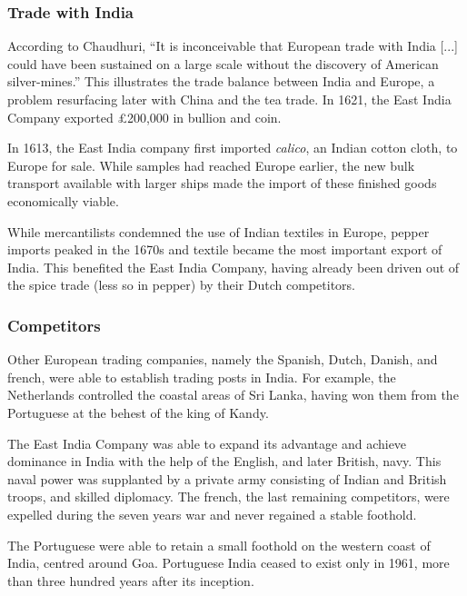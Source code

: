 \documentclass[11pt, a4paper, headings=standardclasses]{scrartcl}
\begin{document}
\subsubsection{Trade with India}
\label{balance}
According to Chaudhuri, ``It is inconceivable that European trade with India [...] could have been sustained on a large scale without the discovery of American silver-mines.''\autocite[395]{FT} This illustrates the trade balance between India and Europe, a problem resurfacing later with China and the tea trade. In 1621, the East India Company exported \pounds{}200,000 in bullion and coin.\autocite[398]{FT}

In 1613, the East India company first imported \textit{calico}, an Indian cotton cloth, to Europe for sale. While samples had reached Europe earlier, the new bulk transport available with larger ships made the import of these finished goods economically viable.\autocite[400]{FT, Calico}

While mercantilists condemned the use of Indian textiles in Europe, pepper imports peaked in the 1670s\autocite[399]{FT} and textile became the most important export of India. This benefited the East India Company, having already been driven out of the spice trade (less so in pepper) by their Dutch competitors.\autocite[401--407]{FT}

\subsubsection{Competitors}

Other European trading companies, namely the Spanish, Dutch, Danish, and french, were able to establish trading posts in India. For example, the Netherlands controlled the coastal areas of Sri Lanka, having won them from the Portuguese at the behest of the king of Kandy.\autocite[Chapter 5]{dutch}

The East India Company was able to expand its advantage and achieve dominance in India with the help of the English, and later British, navy. This naval power was supplanted by a private army consisting of Indian and British troops, and skilled diplomacy.\autocite{ms} The french, the last remaining competitors, were expelled during the seven years war and never regained a stable foothold.\autocite[132-33]{RF} 

The Portuguese were able to retain a small foothold on the western coast of India, centred around Goa. Portuguese India ceased to exist only in 1961, more than three hundred years after its inception.\autocite{PortugueseIndia}
\end{document}
